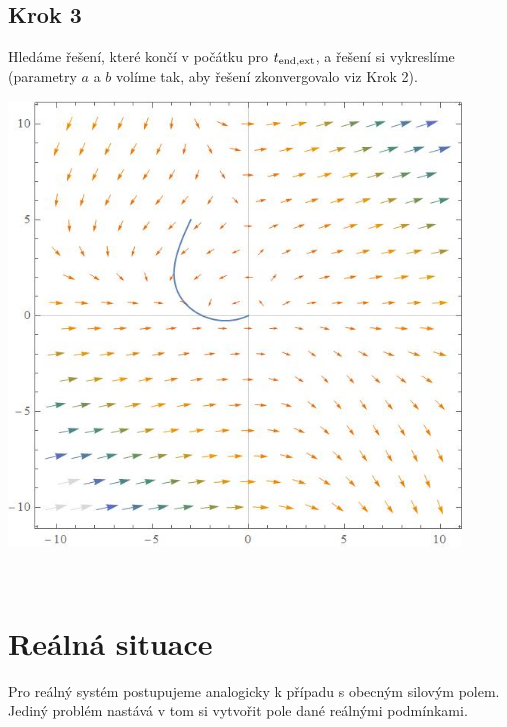 \documentclass[reqno, a4paper]{amsart}
\begin{document}
\subsection*{Krok 3}
Hledáme řešení, které končí v počátku pro $t_{\mathrm{end}, \mathrm{ext}}$, a řešení si vykreslíme (parametry $a$ a $b$ volíme tak, aby řešení zkonvergovalo viz Krok 2).
\begin{verbatim*}
	koren=FindRoot[{x[\[Beta]0][tend]==0,y[\[Beta]0][tend]==0}/.sol,{{\[Beta]0,a},{tend,b}}]
	
	field=VectorPlot[{u(x,y),v(x,y)},{x,-10,10},{y,-10,10},VectorScaling->Automatic,VectorSizes->
	AutomaticPlotTheme->"Scientific"]
	
	ParametricPlot[{x[\[Beta]0/.koren][t],y[\[Beta]0/.koren][t]}/.sol,{t,0,tend/.koren},Frame->True,
	PlotRange->{{-1,1},{-1,1}}];
	
	Show[field,plot]
\end{verbatim*}
\begin{minipage}{\textwidth}
	\centering
	\begin{minipage}[b]{0.5\textwidth}
		\centering
		\includegraphics[width=0.9\textwidth]{obecne3}
	\end{minipage}
	\hfill
\end{minipage}\\
\section{Reálná situace}
Pro reálný systém postupujeme analogicky k případu s obecným silovým polem. Jediný problém nastává v tom si vytvořit pole dané reálnými podmínkami.
\end{document}

